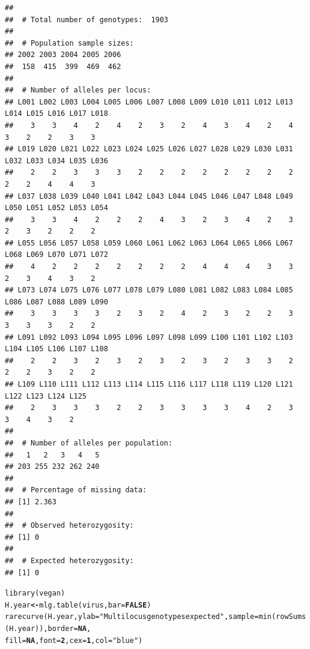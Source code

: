 \documentclass[letterpaper]{article}\usepackage[]{graphicx}\usepackage[]{color}
\makeatletter
\newcommand{\hlnum}[1]{\textcolor[rgb]{0.502,0,0.502}{\textbf{#1}}}%
\newcommand{\hlstr}[1]{\textcolor[rgb]{0.651,0.522,0}{#1}}%
\newcommand{\hlstd}[1]{\textcolor[rgb]{0,0,0}{#1}}%
\newcommand{\hlkwb}[1]{\textcolor[rgb]{0.502,0.502,0.753}{\textbf{#1}}}%
\newcommand{\hlkwc}[1]{\textcolor[rgb]{0,0.502,0.753}{#1}}%
\newcommand{\hlkwd}[1]{\textcolor[rgb]{0,0.267,0.4}{#1}}%
\newenvironment{kframe}{%
 \def\at@end@of@kframe{}%
 \ifinner\ifhmode%
  \def\at@end@of@kframe{\end{minipage}}%
  \begin{minipage}{\columnwidth}%
 \fi\fi%
 \def\FrameCommand##1{\hskip\@totalleftmargin \hskip-\fboxsep
 \colorbox{shadecolor}{##1}\hskip-\fboxsep
     \hskip-\linewidth \hskip-\@totalleftmargin \hskip\columnwidth}%
 \MakeFramed {\advance\hsize-\width
   \@totalleftmargin\z@ \linewidth\hsize
   \@setminipage}}%
 {\par\unskip\endMakeFramed%
 \at@end@of@kframe}
\newenvironment{knitrout}{}{} %
\makeatother
\begin{document}
\begin{knitrout}\footnotesize
{}\color{fgcolor}\begin{kframe}
\begin{verbatim}
## 
##  # Total number of genotypes:  1903
## 
##  # Population sample sizes:  
## 2002 2003 2004 2005 2006 
##  158  415  399  469  462 
## 
##  # Number of alleles per locus:  
## L001 L002 L003 L004 L005 L006 L007 L008 L009 L010 L011 L012 L013 L014 L015 L016 L017 L018 
##    3    3    4    2    4    2    3    2    4    3    4    2    4    3    2    2    3    3 
## L019 L020 L021 L022 L023 L024 L025 L026 L027 L028 L029 L030 L031 L032 L033 L034 L035 L036 
##    2    2    3    3    3    2    2    2    2    2    2    2    2    2    2    4    4    3 
## L037 L038 L039 L040 L041 L042 L043 L044 L045 L046 L047 L048 L049 L050 L051 L052 L053 L054 
##    3    3    4    2    2    2    4    3    2    3    4    2    3    2    3    2    2    2 
## L055 L056 L057 L058 L059 L060 L061 L062 L063 L064 L065 L066 L067 L068 L069 L070 L071 L072 
##    4    2    2    2    2    2    2    2    4    4    4    3    3    2    3    4    3    2 
## L073 L074 L075 L076 L077 L078 L079 L080 L081 L082 L083 L084 L085 L086 L087 L088 L089 L090 
##    3    3    3    3    2    3    2    4    2    3    2    2    3    3    3    3    2    2 
## L091 L092 L093 L094 L095 L096 L097 L098 L099 L100 L101 L102 L103 L104 L105 L106 L107 L108 
##    2    2    3    2    3    2    3    2    3    2    3    3    2    2    2    3    2    2 
## L109 L110 L111 L112 L113 L114 L115 L116 L117 L118 L119 L120 L121 L122 L123 L124 L125 
##    2    3    3    3    2    2    3    3    3    3    4    2    3    3    4    3    2 
## 
##  # Number of alleles per population:  
##   1   2   3   4   5 
## 203 255 232 262 240 
## 
##  # Percentage of missing data:  
## [1] 2.363
## 
##  # Observed heterozygosity:  
## [1] 0
## 
##  # Expected heterozygosity:  
## [1] 0
\end{verbatim}
\end{kframe}
\end{knitrout}

\begin{knitrout}\footnotesize
{}\color{fgcolor}\begin{kframe}
\begin{alltt}
\hlkwd{library}\hlstd{(vegan)}
\hlstd{H.year} \hlkwb{<-} \hlkwd{mlg.table}\hlstd{(virus,} \hlkwc{bar} \hlstd{=} \hlnum{FALSE}\hlstd{)}
\hlkwd{rarecurve}\hlstd{(H.year,} \hlkwc{ylab} \hlstd{=} \hlstr{"Multilocus genotypes expected"}\hlstd{,} \hlkwc{sample} \hlstd{=} \hlkwd{min}\hlstd{(}\hlkwd{rowSums}\hlstd{(H.year)),} \hlkwc{border} \hlstd{=} \hlnum{NA}\hlstd{,}
    \hlkwc{fill} \hlstd{=} \hlnum{NA}\hlstd{,} \hlkwc{font} \hlstd{=} \hlnum{2}\hlstd{,} \hlkwc{cex} \hlstd{=} \hlnum{1}\hlstd{,} \hlkwc{col} \hlstd{=} \hlstr{"blue"}\hlstd{)}
\end{alltt}
\end{kframe}
\end{knitrout}
\end{document}
